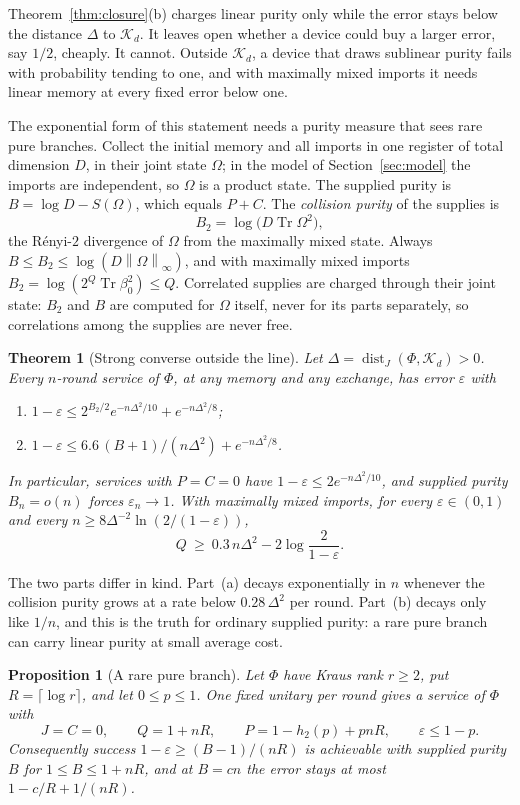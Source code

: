 \documentclass[11pt]{article}
\newtheorem{theorem}{Theorem}
\newtheorem{proposition}[lemma]{Proposition}
\theoremstyle{definition}
\theoremstyle{remark}
\DeclareMathOperator{\Tr}{Tr}
\DeclareMathOperator{\dist}{dist}
\newcommand{\K}{\mathcal K}
\newcommand{\norm}[1]{\left\lVert#1\right\rVert}
\newcommand{\eps}{\varepsilon}
\begin{document}
Theorem~\ref{thm:closure}(b) charges linear purity only while the error stays below the distance $\Delta$ to $\K_d$. It leaves open whether a device could buy a larger error, say $1/2$, cheaply. It cannot. Outside $\K_d$, a device that draws sublinear purity fails with probability tending to one, and with maximally mixed imports it needs linear memory at every fixed error below one.

The exponential form of this statement needs a purity measure that sees rare pure branches. Collect the initial memory and all imports in one register of total dimension $D$, in their joint state $\Omega$; in the model of Section~\ref{sec:model} the imports are independent, so $\Omega$ is a product state. The supplied purity is $B=\log D-S(\Omega)$, which equals $P+C$. The \emph{collision purity} of the supplies is
\[
 B_2=\log\bigl(D\Tr\Omega^2\bigr),
\]
the R\'enyi-$2$ divergence of $\Omega$ from the maximally mixed state. Always $B\le B_2\le\log(D\norm{\Omega}_\infty)$, and with maximally mixed imports $B_2=\log(2^Q\Tr\beta_0^2)\le Q$. Correlated supplies are charged through their joint state: $B_2$ and $B$ are computed for $\Omega$ itself, never for its parts separately, so correlations among the supplies are never free.

\begin{theorem}[Strong converse outside the line]\label{thm:strong}
Let $\Delta=\dist_J(\Phi,\K_d)>0$. Every $n$-round service of $\Phi$, at any memory and any exchange, has error $\eps$ with
\begin{enumerate}[label=(\alph*),itemsep=3pt]
\item $1-\eps\le2^{B_2/2}e^{-n\Delta^2/10}+e^{-n\Delta^2/8}$;
\item $1-\eps\le6.6\,(B+1)/(n\Delta^2)+e^{-n\Delta^2/8}$.
\end{enumerate}
In particular, services with $P=C=0$ have $1-\eps\le2e^{-n\Delta^2/10}$, and supplied purity $B_n=o(n)$ forces $\eps_n\to1$. With maximally mixed imports, for every $\eps\in(0,1)$ and every $n\ge8\Delta^{-2}\ln(2/(1-\eps))$,
\[
 Q\ \ge\ 0.3\,n\Delta^2-2\log\frac{2}{1-\eps}.
\]
\end{theorem}

The two parts differ in kind. Part~(a) decays exponentially in $n$ whenever the collision purity grows at a rate below $0.28\,\Delta^2$ per round. Part~(b) decays only like $1/n$, and this is the truth for ordinary supplied purity: a rare pure branch can carry linear purity at small average cost.

\begin{proposition}[A rare pure branch]\label{prop:coin}
Let $\Phi$ have Kraus rank $r\ge2$, put $R=\lceil\log r\rceil$, and let $0\le p\le1$. One fixed unitary per round gives a service of $\Phi$ with
\[
 J=C=0,\qquad Q=1+nR,\qquad P=1-h_2(p)+pnR,\qquad \eps\le1-p.
\]
Consequently success $1-\eps\ge(B-1)/(nR)$ is achievable with supplied purity $B$ for $1\le B\le1+nR$, and at $B=cn$ the error stays at most $1-c/R+1/(nR)$.
\end{proposition}
\end{document}
